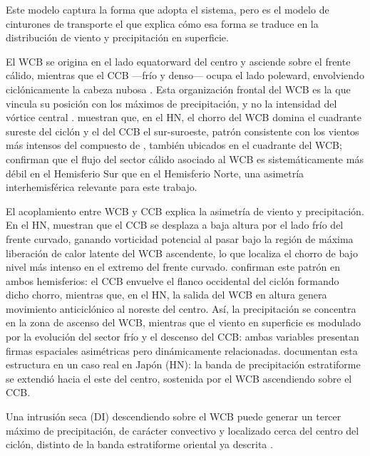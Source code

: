 Este modelo captura la forma que adopta el sistema, pero es el modelo de cinturones de transporte \citep{browning1986conceptual} el que explica cómo esa forma se traduce en la distribución de viento y precipitación en superficie.

El WCB se origina en el lado equatorward del centro y asciende sobre el frente cálido, mientras que el CCB —frío y denso— ocupa el lado poleward, envolviendo ciclónicamente la cabeza nubosa \citep{dacre2023climatology}. Esta organización frontal del WCB es la que vincula su posición con los máximos de precipitación, y no la intensidad del vórtice central \citep{catto2015fronts}. \citet{eisenstein2023identification} muestran que, en el HN, el chorro del WCB domina el cuadrante sureste del ciclón y el del CCB el sur-suroeste, patrón consistente con los vientos más intensos del compuesto de \citet{catto2010climate}, también ubicados en el cuadrante del WCB; \citet{hodges2011comparison} confirman que el flujo del sector cálido asociado al WCB es sistemáticamente más débil en el Hemisferio Sur que en el Hemisferio Norte, una asimetría interhemisférica relevante para este trabajo.

El acoplamiento entre WCB y CCB explica la asimetría de viento y precipitación. En el HN, \citet{schemm2014linkage} muestran que el CCB se desplaza a baja altura por el lado frío del frente curvado, ganando vorticidad potencial al pasar bajo la región de máxima liberación de calor latente del WCB ascendente, lo que localiza el chorro de bajo nivel más intenso en el extremo del frente curvado. \citet{priestley2022improved} confirman este patrón en ambos hemisferios: el CCB envuelve el flanco occidental del ciclón formando dicho chorro, mientras que, en el HN, la salida del WCB en altura genera movimiento anticiclónico al noreste del centro. Así, la precipitación se concentra en la zona de ascenso del WCB, mientras que el viento en superficie es modulado por la evolución del sector frío y el descenso del CCB: ambas variables presentan firmas espaciales asimétricas pero dinámicamente relacionadas. \citet{sawada2021heavy} documentan esta estructura en un caso real en Japón (HN): la banda de precipitación estratiforme se extendió hacia el este del centro, sostenida por el WCB ascendiendo sobre el CCB.

Una intrusión seca (DI) descendiendo sobre el WCB puede generar un tercer máximo de precipitación, de carácter convectivo y localizado cerca del centro del ciclón, distinto de la banda estratiforme oriental ya descrita \citep{sawada2021heavy}.

